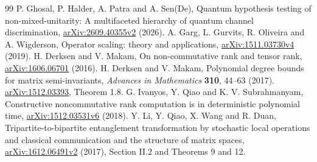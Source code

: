 \documentclass[11pt,a4paper]{article}
\theoremstyle{remark}\newtheorem{remark}[theorem]{Remark}
\begin{document}
\begin{thebibliography}{99}
 P. Ghosal, P. Halder, A. Patra and A. Sen(De), Quantum hypothesis testing of non-mixed-unitarity: A multifaceted hierarchy of quantum channel discrimination, \href{https://arxiv.org/abs/2609.40355v2}{arXiv:2609.40355v2} (2026).
 A. Garg, L. Gurvits, R. Oliveira and A. Wigderson, Operator scaling: theory and applications, \href{https://arxiv.org/abs/1511.03730v4}{arXiv:1511.03730v4} (2019).
 H. Derksen and V. Makam, On non-commutative rank and tensor rank, \href{https://arxiv.org/abs/1606.06701}{arXiv:1606.06701} (2016).
 H. Derksen and V. Makam, Polynomial degree bounds for matrix semi-invariants, \emph{Advances in Mathematics} \textbf{310}, 44--63 (2017). \href{https://arxiv.org/abs/1512.03393}{arXiv:1512.03393}, Theorem 1.8.
 G. Ivanyos, Y. Qiao and K. V. Subrahmanyam, Constructive noncommutative rank computation is in deterministic polynomial time, \href{https://arxiv.org/abs/1512.03531v6}{arXiv:1512.03531v6} (2018).
 Y. Li, Y. Qiao, X. Wang and R. Duan, Tripartite-to-bipartite entanglement transformation by stochastic local operations and classical communication and the structure of matrix spaces, \href{https://arxiv.org/abs/1612.06491v2}{arXiv:1612.06491v2} (2017), Section II.2 and Theorems 9 and 12.
\end{thebibliography}
\end{document}
